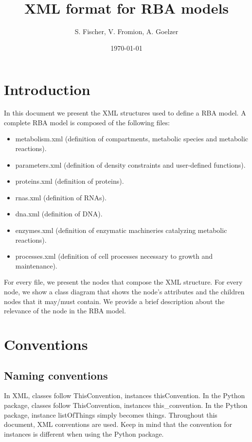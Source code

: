 \documentclass[12pt]{scrartcl}
\begin{document}
\title{XML format for RBA models}
\author{S. Fischer, V. Fromion, A. Goelzer}
\date{\today}

\maketitle

\newpage

\tableofcontents

\newpage

\section{Introduction}

In this document we present the XML structures used to define a RBA model.
A complete RBA model is composed of the following files:
\begin{itemize}
  \item metabolism.xml
  (definition of compartments, metabolic species and metabolic reactions).
  \item parameters.xml
  (definition of density constraints and user-defined functions).
  \item proteins.xml (definition of proteins).
  \item rnas.xml (definition of RNAs).
  \item dna.xml (definition of DNA).
  \item enzymes.xml
  (definition of enzymatic machineries catalyzing metabolic reactions).
  \item processes.xml
  (definition of cell processes necessary to growth and maintenance).
\end{itemize}

For every file, we present the nodes that compose the XML structure.
For every node, we show a class diagram that shows the node's attributes
and the children nodes that it may/must contain.
We provide a brief description about the relevance of the node
in the RBA model.


\section{Conventions}

\subsection{Naming conventions}

In XML, classes follow ThisConvention, instances thisConvention.
In the Python package, classes follow ThisConvention, instances this\_convention.
In the Python package, instance listOfThings simply becomes things.
Throughout this document, XML conventions are used.
Keep in mind that the convention for instances is different when using the
Python package.
\end{document}

